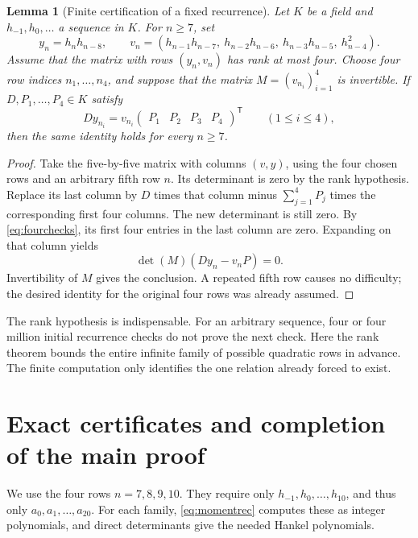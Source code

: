 \documentclass[11pt,letterpaper]{article}
\numberwithin{equation}{section}
\newtheorem{lemma}[theorem]{Lemma}
\theoremstyle{definition}
\begin{document}
\begin{lemma}[Finite certification of a fixed recurrence]
\label{lem:finite}
Let \(K\) be a field and \(h_{-1},h_0,\ldots\) a sequence in \(K\).
For \(n\geq7\), set
\begin{equation}
 y_n=h_nh_{n-8},\qquad
 v_n=(h_{n-1}h_{n-7},\ h_{n-2}h_{n-6},\ h_{n-3}h_{n-5},\ h_{n-4}^2).
\end{equation}
Assume that the matrix with rows \((y_n,v_n)\) has rank at most four.
Choose four row indices \(n_1,\ldots,n_4\), and suppose that the matrix
\(M=(v_{n_i})_{i=1}^4\) is invertible. If \(D,P_1,\ldots,P_4\in K\)
satisfy
\begin{equation}
 Dy_{n_i}=v_{n_i}\begin{pmatrix}P_1&P_2&P_3&P_4\end{pmatrix}^{\mathsf T}
 \qquad(1\leq i\leq4),
 \label{eq:fourchecks}
\end{equation}
then the same identity holds for every \(n\geq7\).
\end{lemma}
\begin{proof}
Take the five-by-five matrix with columns \((v,y)\), using the four chosen
rows and an arbitrary fifth row \(n\). Its determinant is zero by the rank
hypothesis. Replace its last column by \(D\) times that column minus
\(\sum_{j=1}^4P_j\) times the corresponding first four columns.
The new determinant is still zero. By \eqref{eq:fourchecks}, its first
four entries in the last column are zero. Expanding on that column yields
\begin{equation}
 \det(M)\left(Dy_n-v_nP\right)=0.
\end{equation}
Invertibility of \(M\) gives the conclusion. A repeated fifth row causes
no difficulty; the desired identity for the original four rows was already
assumed.
\end{proof}

The rank hypothesis is indispensable. For an arbitrary sequence, four or
four million initial recurrence checks do not prove the next check. Here
the rank theorem bounds the entire infinite family of possible quadratic
rows in advance. The finite computation only identifies the one relation
already forced to exist.

\section{Exact certificates and completion of the main proof}
\label{sec:certificate}

We use the four rows \(n=7,8,9,10\). They require only
\(h_{-1},h_0,\ldots,h_{10}\), and thus only
\(a_0,a_1,\ldots,a_{20}\). For each family, \eqref{eq:momentrec}
computes these as integer polynomials, and direct determinants give the
needed Hankel polynomials.
\end{document}
